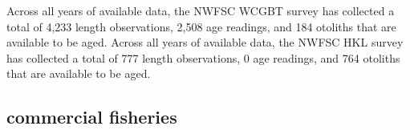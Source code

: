 \documentclass[11pt,
  english,
  letterpaper,
]{article}
\begin{document}
\leavevmode\tagmcend\tagstructend\par


Across all years of available data, the NWFSC WCGBT survey has collected a total of 4,233 length observations, 2,508 age readings, and 184 otoliths that are available to be aged. Across all years of available data, the NWFSC HKL survey has collected a total of 777 length observations, 0 age readings, and 764 otoliths that are available to be aged.

\leavevmode\tagmcend\tagstructend\par


\hypertarget{commercial-fisheries-57}{%
\subsection{commercial fisheries}\label{commercial-fisheries-57}}

\leavevmode\tagmcend\tagstructend


\begingroup\fontsize{10}{12}\selectfont \begingroup\fontsize{10}{12}\selectfont

\leavevmode\tagmcend\tagstructend\par
\end{document}
